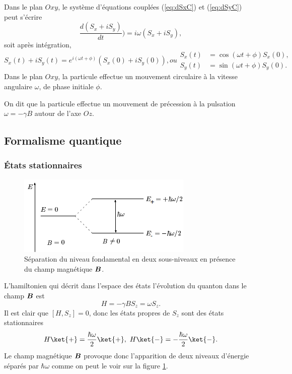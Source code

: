Dans le plan $Oxy$, le système d'équations couplées (\ref{eq:dSxC}) et
(\ref{eq:dSyC}) peut s'écrire
\begin{equation}
 \frac{d(S_{x}+iS_{y})}{dt})=i\omega(S_{x}+iS_{y}),
\end{equation}
soit après intégration,
\begin{subequations}
\begin{equation}
 S_{x}(t)+iS_{y}(t)=e^{i(\omega t +\phi)}(S_{x}(0)+iS_{y}(0)),
\end{equation}
ou
\begin{align}
 S_{x}(t) &=\cos(\omega t +\phi)S_{x}(0),\\
 S_{y}(t)&=\sin(\omega t +\phi)S_{y}(0).
\end{align}

\end{subequations}
Dans le plan $Oxy$, la particule effectue un mouvement circulaire à la vitesse
angulaire $\omega$, de phase initiale $\phi$.

On dit que la particule effectue un mouvement de précession à la pulsation
$\omega=-\gamma B$ autour de l'axe $Oz$.

\subsection{Formalisme quantique}

\subsubsection{États stationnaires}

\begin{figure}
\includegraphics[scale=.9]{graphics/EieSpin.png}
\caption{Séparation du niveau fondamental en deux sous-niveaux en présence du
champ magnétique $\boldsymbol{B}$.}
\label{fig:EieSpin}
\end{figure}
L'hamiltonien qui décrit dans l'espace des états l'évolution du quanton dans
le champ $\boldsymbol{B}$ est
\begin{equation}
H=-\gamma BS_z=\omega S_z.
\end{equation}
Il est clair que $[H,S_z]=0$, donc les états propres de $S_z$ sont
des états stationnaires%
\begin{equation}
H\ket{+}=\frac{\hbar\omega}{2}\ket{+},~H\ket{-}=-\frac{\hbar\omega}{2}\ket{-}.
\end{equation}
Le champ magnétique $\boldsymbol{B}$ provoque donc l'apparition de deux niveaux
d'énergie séparés par $\hbar\omega$ comme on peut le voir sur la figure
\ref{fig:EieSpin}.

